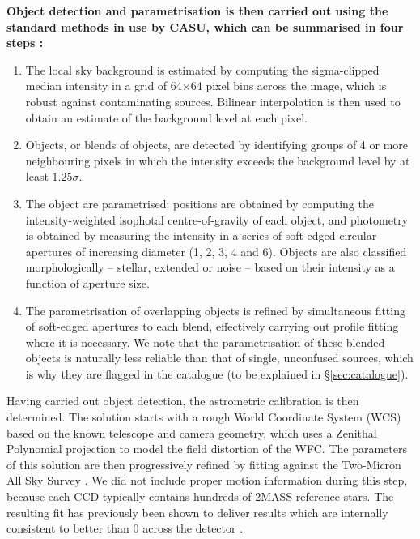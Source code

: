 \documentclass[a4paper,useAMS,usenatbib]{mn2e}
\begin{document}
{ \bf
Object detection and parametrisation is then carried out
using the standard methods in use by CASU,
which can be summarised in four steps
\citep[a discussion on each of these steps
and related points can be found in][]{Irwin1985,Irwin1997}:
\begin{enumerate}
\item The local sky background is estimated
by computing the sigma-clipped median intensity
in a grid of 64$\times$64 pixel bins across the image,
which is robust against contaminating sources.
Bilinear interpolation is then used to obtain an estimate 
of the background level at each pixel.
\item Objects, or blends of objects, are detected
by identifying groups of 4 or more neighbouring pixels
in which the intensity exceeds the background level by at least $1.25\sigma$.
\item The object are parametrised:
positions are obtained by computing 
the intensity-weighted isophotal centre-of-gravity
of each object,
and photometry is obtained 
by measuring the intensity
in a series of soft-edged circular apertures of increasing diameter 
(1, 2, 3, 4 and 6).
Objects are also classified morphologically
-- stellar, extended or noise --
based on their intensity as a function of aperture size.
\item The parametrisation of overlapping objects
is refined by simultaneous fitting of
soft-edged apertures to each blend,
effectively carrying out profile fitting where it is necessary.
We note that the parametrisation of these blended objects is naturally
less reliable than that of single, unconfused sources,
which is why they are flagged in the catalogue
(to be explained in \S\ref{sec:catalogue}).
\end{enumerate}

Having carried out object detection,
the astrometric calibration is then determined.
The solution starts with a rough 
World Coordinate System (WCS)
based on the known telescope and camera geometry,
which uses a Zenithal Polynomial projection
\citep[ZPN;][]{Calabretta2002}
to model the field distortion of the WFC.
The parameters of this solution
are then progressively refined by fitting against the
Two-Micron All Sky Survey \citep[2MASS; ][]{Skrutskie2006}.
We did not include proper motion information during this step,
because each CCD typically contains
hundreds of 2MASS reference stars.
The resulting fit has previously been shown
to deliver results which are internally consistent
to better than 0 across the detector
\citep{Gonzalez-Solares2008}.

}
\end{document}
